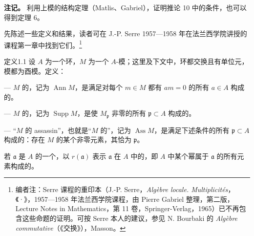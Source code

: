 \textbf{注记。}
利用上模的结构定理（Matlis、Gabriel），证明推论 10 中的条件，也可以得到定理 6。

先陈述一些定义和结果，读者可在 J.-P. Serre 1957—1958 年在法兰西学院讲授的课程第一章中找到它们。\footnote{编者注：Serre 课程的重印本（J.-P. Serre，\emph{Algèbre locale. Multiplicités}，《·》，1957—1958 年法兰西学院课程，由 Pierre Gabriel 整理，第二版，Lecture Notes in Mathematics，第 11 卷，Springer-Verlag，1965）已不再包含这些命题的证明。可按 Serre 本人的建议，参见 N. Bourbaki 的 \emph{Algèbre commutative}（《交换》），Masson。}
\begin{SGAresult}{定义}{1.1}
设 $A$ 为一个环，$M$ 为一个 $A$-模；这里及下文中，环都交换且有单位元，模都为酉模。定义：

--- $M$ 的，记为 $\operatorname{Ann}M$，是满足对每个 $m\in M$ 都有 $am=0$ 的所有 $a\in A$ 构成的。

--- $M$ 的，记为 $\operatorname{Supp}M$，是使 $M_{\mathfrak p}$ 非零的所有 $\mathfrak p\subset A$ 构成的。

--- “$M$ 的 assassin”，也就是“$M$ 的”，记为 $\operatorname{Ass}M$，是满足下述条件的所有 $\mathfrak p\subset A$ 构成的：存在 $M$ 的某个非零元素，其恰为 $\mathfrak p$。
\end{SGAresult}
若 $\mathfrak a$ 是 $A$ 的一个，以 $r(\mathfrak a)$ 表示 $\mathfrak a$ 在 $A$ 中的，即 $A$ 中某个幂属于 $\mathfrak a$ 的所有元素构成的。

